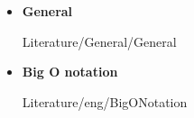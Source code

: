 \begin{itemize}
  \item
    \textbf{General}
    \begin{btSect}{Literature/General/General}
      \btPrintAll
    \end{btSect}
\end{itemize}
\newpage
\begin{itemize}
  \item
    \textbf{Big O notation}
    \begin{btSect}{Literature/eng/BigONotation}
      \btPrintAll
    \end{btSect}
\end{itemize}